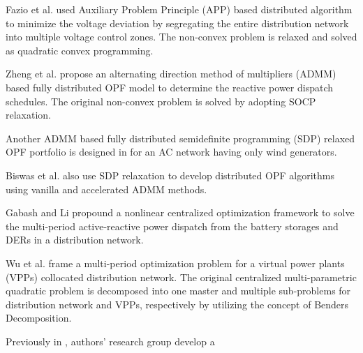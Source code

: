 \documentclass{article}
\begin{document}
Fazio et al. \cite{Fazio} used Auxiliary Problem Principle (APP) based distributed algorithm to minimize the voltage deviation by segregating the entire distribution network into multiple voltage control zones. The non-convex problem is relaxed and solved as quadratic convex programming.

Zheng et al. \cite{Zheng} propose an alternating direction method of multipliers (ADMM) based fully distributed OPF model to determine the reactive power dispatch schedules. The original non-convex problem is solved by adopting SOCP relaxation.

Another ADMM based fully distributed semidefinite programming (SDP) relaxed OPF portfolio is designed in  \cite{Wang} for an AC network having only wind generators. 

Biswas et al. \cite{Biswas} also use SDP relaxation to develop distributed OPF algorithms using vanilla and accelerated ADMM methods. 

Gabash and Li \cite{Gabash} propound a nonlinear centralized optimization framework to solve the multi-period active-reactive power dispatch from the battery storages and DERs in a distribution network. 

Wu et al. \cite{Wu} frame a multi-period optimization problem for a virtual power plants (VPPs) collocated distribution network. The original centralized multi-parametric quadratic problem is decomposed into one master and multiple sub-problems for distribution network and VPPs, respectively by utilizing the concept of Benders Decomposition. 



Previously in \cite{Sadnan}, authors' research group develop a 
\end{document}
